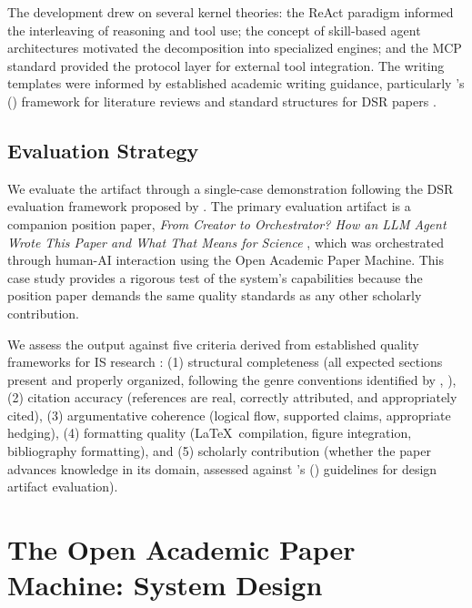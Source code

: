 \documentclass{article}
\begin{document}
The development drew on several kernel theories: the ReAct paradigm \citep{yao2022react} informed the interleaving of reasoning and tool use; the concept of skill-based agent architectures \citep{ferrag2025llm_agents} motivated the decomposition into specialized engines; and the MCP standard provided the protocol layer for external tool integration. The writing templates were informed by established academic writing guidance, particularly \citeauthor{webster2002literature}'s (\citeyear{webster2002literature}) framework for literature reviews and standard structures for DSR papers \citep{peffers2007dsrm,gregor2013positioning}.

\subsection{Evaluation Strategy}

We evaluate the artifact through a single-case demonstration following the DSR evaluation framework proposed by \citet{peffers2007dsrm}. The primary evaluation artifact is a companion position paper, \emph{From Creator to Orchestrator? How an LLM Agent Wrote This Paper and What That Means for Science} \citep{blask2026creator}, which was orchestrated through human-AI interaction using the Open Academic Paper Machine. This case study provides a rigorous test of the system's capabilities because the position paper demands the same quality standards as any other scholarly contribution.

We assess the output against five criteria derived from established quality frameworks for IS research \citep{hevner2004design,webster2002literature}: (1) structural completeness (all expected sections present and properly organized, following the genre conventions identified by \citeauthor{swales1990genre}, \citeyear{swales1990genre}), (2) citation accuracy (references are real, correctly attributed, and appropriately cited), (3) argumentative coherence (logical flow, supported claims, appropriate hedging), (4) formatting quality (\LaTeX\ compilation, figure integration, bibliography formatting), and (5) scholarly contribution (whether the paper advances knowledge in its domain, assessed against \citeauthor{hevner2004design}'s (\citeyear{hevner2004design}) guidelines for design artifact evaluation).


\section{The Open Academic Paper Machine: System Design}
\end{document}
